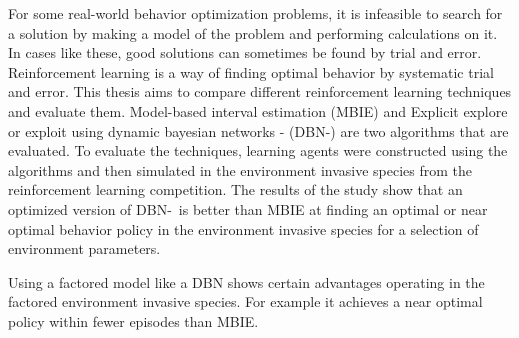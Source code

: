 
For some real-world behavior optimization problems, it is infeasible to search for a solution by making a model of the problem and performing calculations on it. 
In cases like these, good solutions can sometimes be found by trial and error. 
Reinforcement learning is a way of finding optimal behavior by systematic trial and error.
This thesis aims to compare different reinforcement learning techniques and evaluate them. 
Model-based interval estimation (MBIE) and Explicit explore or exploit using dynamic bayesian networks - (DBN-\etre)
 are two algorithms that are evaluated. 
To evaluate the techniques, learning agents were constructed using the algorithms and 
then simulated in the environment invasive species from the reinforcement learning competition.
The results of the study show that an optimized version of DBN-\etre\ is better than MBIE at finding an optimal or near optimal behavior policy in the 
environment invasive species for a selection of environment parameters.

Using a factored model like a DBN shows certain advantages operating in 
the factored environment invasive species. For example it achieves a near optimal
policy within fewer episodes than MBIE.






